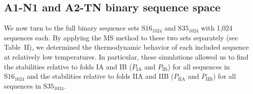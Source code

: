 \documentclass[
aip,
rsi,%
amsmath,amssymb,
reprint,%
]{revtex4-1}
\newcommand {\PIA}    	{{P_\mathrm{IA}}}
\newcommand {\PIB}    	{{P_\mathrm{IB}}}
\newcommand {\PIIA}    	{{P_\mathrm{IIA}}}
\newcommand {\PIIB}    	{{P_\mathrm{IIB}}}
\newcommand {\SI}		{${\mathrm{S16}_{1024}}$}
\newcommand {\SII}		{${\mathrm{S35}_{1024}}$}
\begin{document}

\vspace{12pt}
\subsection{A1-N1 and A2-TN binary sequence space}
\noindent
We now turn to the full binary sequence sets {\SI} and {\SII} with 1,024 sequences each. By applying the MS method to these two sets separately (see Table~II), we determined the thermodynamic behavior of each included sequence at relatively low temperatures. In particular, these simulations allowed us to find the stabilities relative to folds IA and IB ($\PIA$ and $\PIB$) for all sequences in {\SI} and the stabilities relative to folds IIA and IIB ($\PIIA$ and $\PIIB$) for all sequences in {\SII}.
\end{document}

